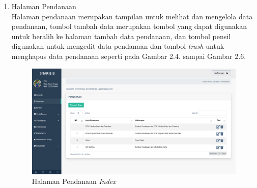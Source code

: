 \begin{enumerate}






  \item Halaman Pendanaan \\ Halaman pendanaan merupakan tampilan untuk melihat dan mengelola data pendanaan, tombol tambah data merupakan tombol yang dapat digunakan untuk beralih ke halaman tambah data pendanaan, dan tombol pensil digunakan untuk mengedit data pendanaan dan tombol \textit{trash} untuk menghapus data pendanaan seperti pada Gambar 2.4. sampai Gambar 2.6.

        \begin{figure}
          \centering
          \includegraphics[width=0.82\linewidth]{konten//gambar/pendanaan.png}
          \caption{Halaman Pendanaan \textit{Index}}
          \label{fig:enter-label}
        \end{figure}


\end{enumerate}
